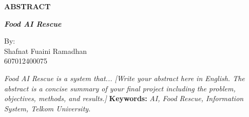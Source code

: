 \newpage
\begin{center}
    {\Large\bfseries ABSTRACT \par}
    \vspace{0.5cm}
    {\large\bfseries\itshape Food AI Rescue \par}
    \vspace{0.5cm}
    By: \\
    Shafnat Fuaini Ramadhan \\
    607012400075 \\
\end{center}
\vspace{1cm}
\textit{Food AI Rescue is a system that... [Write your abstract here in English. The abstract is a concise summary of your final project including the problem, objectives, methods, and results.]}
\vspace{1cm}
\noindent \textbf{Keywords:} \textit{AI, Food Rescue, Information System, Telkom University.}

\newpage
\tableofcontents
\newpage
\listoffigures
\newpage
\listoftables
\newpage
